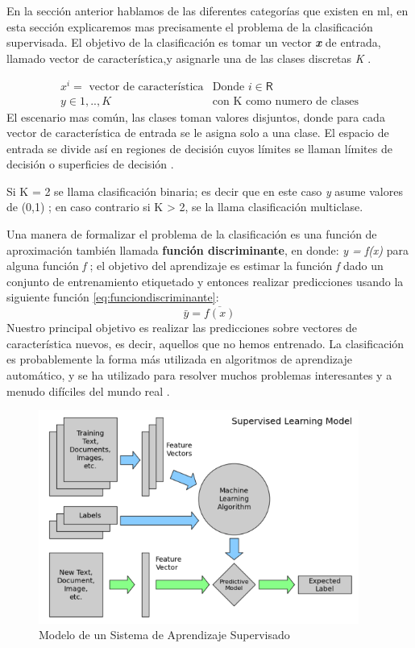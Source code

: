 En la sección anterior hablamos de las diferentes categorías que existen en \ac{ml}, en esta sección explicaremos mas precisamente el problema de la clasificación supervisada. El objetivo de la clasificación es tomar un vector \textit{\textbf{x}} de entrada, llamado vector de característica,y asignarle una de las clases discretas \textit{K} \citep{bishop}.

\begin{equation}
\begin{array}{cc}
x^i = \text{ vector de característica} &  \text{Donde } i \in \mathsf{R} \\
y \in {1,..,K} & \text{con K como numero de clases}
\end{array}
\end{equation}
El escenario mas común, las clases toman valores  disjuntos, donde para cada vector de característica de entrada se le asigna solo a una clase. El espacio de entrada se divide así en regiones de decisión cuyos límites se llaman límites de decisión o superficies de decisión \citep{bishop}.

Si K = 2 se llama clasificación binaria; es decir que en este caso \textit{y} asume valores de (0,1) ; en caso contrario si K > 2, se la llama clasificación multiclase.

Una manera de  formalizar el problema de la clasificación es una función de aproximación también llamada \textbf{función discriminante}, en donde: \textit{y = f(x)} para alguna función \textit{f} ; el objetivo del aprendizaje es estimar la función \textit{f} dado un conjunto de entrenamiento etiquetado y entonces realizar predicciones usando la siguiente función \ref{eq:funciondiscriminante}:
\begin{equation}\label{eq:funciondiscriminante}
\bar{y}= \overline{f(x)}
\end{equation}
Nuestro principal objetivo es realizar las predicciones sobre vectores de característica nuevos, es decir, aquellos que no hemos entrenado. La clasificación es probablemente la forma más utilizada en algoritmos de aprendizaje automático, y se ha utilizado para resolver muchos problemas interesantes y a menudo difíciles del mundo real  \citep{murphy}.

\begin{figure}[H]
 \centering
  \includegraphics[height=7cm,keepaspectratio=true,clip=true]{imagenes/Logos/01_supervised_learning.png}
  \caption{Modelo de un Sistema de Aprendizaje Supervisado}
	\label{Fig: aprendsupervisado}
\end{figure}

